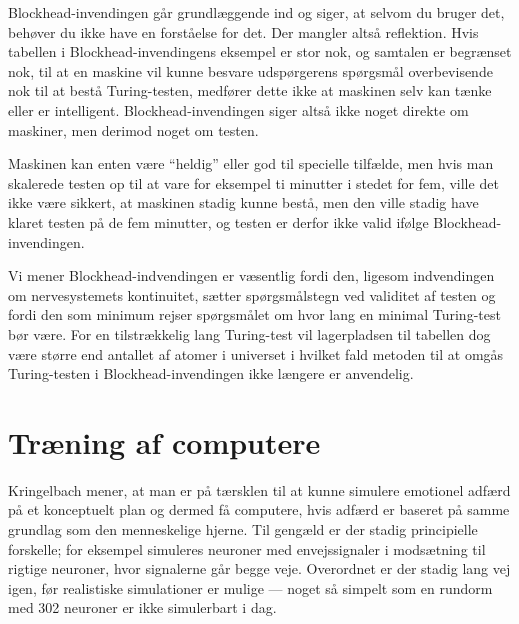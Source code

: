 \documentclass{article}
\begin{document}
Blockhead-invendingen går grundlæggende ind og siger, at selvom du bruger det, behøver du ikke have en forståelse for det. Der mangler altså reflektion.
Hvis tabellen i Blockhead-invendingens eksempel er stor nok, og samtalen er begrænset nok, til at en maskine vil kunne besvare udspørgerens spørgsmål overbevisende nok til at bestå Turing-testen, medfører dette ikke at maskinen selv kan tænke eller er intelligent. Blockhead-invendingen siger altså ikke noget direkte om maskiner, men derimod noget om testen.

Maskinen kan enten være ``heldig'' eller god til specielle tilfælde, men hvis man skalerede testen op til at vare for eksempel ti minutter i stedet for fem, ville det ikke være sikkert, at maskinen stadig kunne bestå, men den ville stadig have klaret testen på de fem minutter, og testen er derfor ikke valid ifølge Blockhead-invendingen.

Vi mener Blockhead-indvendingen er væsentlig fordi den, ligesom indvendingen om nervesystemets kontinuitet, sætter spørgsmålstegn ved validitet af testen og fordi den som minimum rejser spørgsmålet om hvor lang en minimal Turing-test bør være. For en tilstrækkelig lang Turing-test vil lagerpladsen til tabellen dog være større end antallet af atomer i universet i hvilket fald metoden til at omgås Turing-testen i Blockhead-invendingen ikke længere er anvendelig.

\section{Træning af computere}
Kringelbach mener, at man er på tærsklen til at kunne simulere emotionel adfærd på et konceptuelt plan og dermed få computere, hvis adfærd er baseret på samme grundlag som den menneskelige hjerne. Til gengæld er der stadig principielle forskelle; for eksempel simuleres neuroner med envejssignaler i modsætning til rigtige neuroner, hvor signalerne går begge veje. Overordnet er der stadig lang vej igen, før realistiske simulationer er mulige --- noget så simpelt som en rundorm med 302 neuroner er ikke simulerbart i dag.
\end{document}
